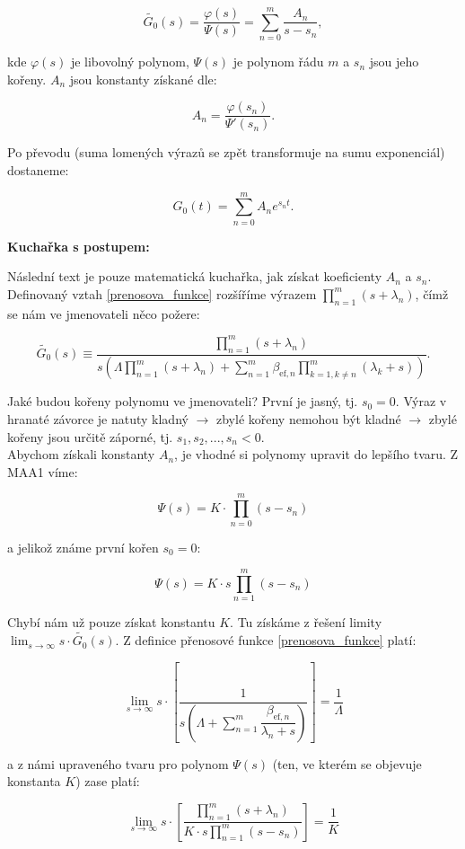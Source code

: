 $$ \tilde{G_0}(s) = \dfrac{\varphi(s)}{\Psi(s)} = \sum_{n=0}^m \dfrac{A_n}{s-s_n}, $$

kde $\varphi(s)$ je libovolný polynom, $\Psi(s)$ je polynom řádu $m$ a $s_n$ jsou jeho kořeny. $A_n$ jsou konstanty získané dle:

$$ A_n = \dfrac{\varphi(s_n)}{\Psi'(s_n)}. $$

Po převodu (suma lomených výrazů se zpět transformuje na sumu exponenciál) dostaneme:

\begin{equation}
  \boxed{
  G_0(t) = \sum_{n=0}^m A_n e^{s_n t}.
  \label{prenosova_funkce_reseni}
  }
\end{equation}

\textbf{Kuchařka s postupem:}

Následní text je pouze matematická kuchařka, jak získat koeficienty $A_n$ a $s_n$. Definovaný vztah \eqref{prenosova_funkce} rozšíříme výrazem $\prod_{n=1}^m (s+\lambda_n)$, čímž se nám ve jmenovateli něco požere:

$$ \tilde{G_0}(s) \equiv \dfrac{\prod_{n=1}^m (s+\lambda_n)}{s \left ( \Lambda \prod_{n=1}^m (s+\lambda_n)  + \sum_{n=1}^m \beta_{\text{ef},n}\prod_{k=1, k \neq n}^m(\lambda_k + s) \right )}. $$

Jaké budou kořeny polynomu ve jmenovateli? První je jasný, tj. $s_0 = 0$. Výraz v hranaté závorce je natuty kladný $\rightarrow$ zbylé kořeny nemohou být kladné $\rightarrow$ zbylé kořeny jsou určitě záporné, tj. $s_1, s_2, ..., s_n < 0$.\\

Abychom získali konstanty $A_n$, je vhodné si polynomy upravit do lepšího tvaru. Z MAA1 víme:

$$ \Psi(s) = K \cdot \prod_{n=0}^m (s-s_n) $$

a jelikož známe první kořen $s_0 = 0$:

$$ \Psi(s) = K \cdot s \prod_{n=1}^m (s-s_n) $$

Chybí nám už pouze získat konstantu $K$. Tu získáme z řešení limity $\lim_{s \to \infty} s \cdot \tilde{G_0}(s)$. Z definice přenosové funkce \eqref{prenosova_funkce} platí:

$$ \lim_{s \to \infty} s \cdot \left [ \dfrac{1}{s \left ( \Lambda + \sum_{n=1}^m \dfrac{\beta_{\text{ef},n}}{\lambda_n + s} \right )} \right ] = \dfrac{1}{\Lambda} $$

a z námi upraveného tvaru pro polynom $\Psi(s)$ (ten, ve kterém se objevuje konstanta $K$) zase platí:

$$ \lim_{s \to \infty} s \cdot \left [ \dfrac{\prod_{n=1}^m (s+\lambda_n)}{K \cdot s \prod_{n=1}^m (s-s_n)} \right ] = \dfrac{1}{K} $$

